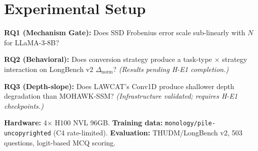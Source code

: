 \section{Experimental Setup}

\textbf{RQ1 (Mechanism Gate):} Does SSD Frobenius error scale sub-linearly with $N$ for
LLaMA-3-8B?

\textbf{RQ2 (Behavioral):} Does conversion strategy produce a task-type $\times$ strategy
interaction on LongBench v2 $\Delta_\text{norm}$? \emph{(Results pending H-E1 completion.)}

\textbf{RQ3 (Depth-slope):} Does LAWCAT's Conv1D produce shallower depth degradation than
MOHAWK-SSM? \emph{(Infrastructure validated; requires H-E1 checkpoints.)}

\textbf{Hardware:} 4$\times$ H100 NVL 96GB.
\textbf{Training data:} \texttt{monology/pile-uncopyrighted} (C4 rate-limited).
\textbf{Evaluation:} THUDM/LongBench v2, 503 questions, logit-based MCQ scoring.

